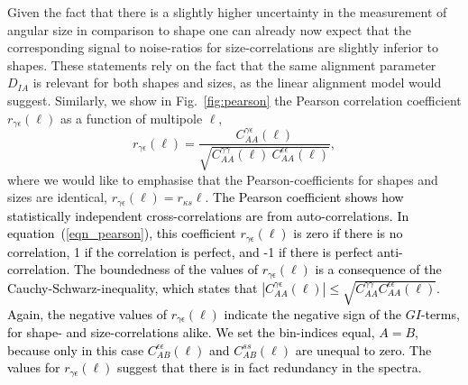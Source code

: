 \documentclass[a4paper,fleqn,usenatbib]{mnras}
\newcommand\spirou[1]{\textcolor{black}{#1}}
\begin{document}
Given the fact that there is a slightly higher uncertainty in the measurement of angular size in comparison to shape one can already now expect that the corresponding signal to noise-ratios for size-correlations are slightly inferior to shapes. These statements rely on the fact that the same alignment parameter $D_{IA}$ is relevant for both shapes and sizes, as the linear alignment model would suggest. Similarly, we show in Fig.~\ref{fig:pearson} the Pearson correlation coefficient $r_{\gamma\epsilon}(\ell)$ as a function of multipole $\ell$,
\begin{equation}
r_{\gamma\epsilon}(\ell) = 
\frac{C^{\gamma\epsilon}_{AA}(\ell)}{\sqrt{C^{\gamma\gamma}_{AA}(\ell)\: C^{\epsilon\epsilon}_{AA}(\ell)}},
\label{eqn_pearson}
\end{equation}
where we would like to emphasise that the Pearson-coefficients for shapes and sizes are identical, $r_{\gamma\epsilon}(\ell) = r_{\kappa s}{\ell}$. \spirou{The Pearson coefficient shows how statistically independent cross-correlations are from auto-correlations. In equation~(\ref{eqn_pearson}), this coefficient $r_{\gamma\epsilon}(\ell)$ is zero if there is no correlation, 1 if the correlation is perfect, and -1 if there is perfect anti-correlation. The boundedness of the values of $r_{\gamma\epsilon}(\ell)$ is a consequence of the Cauchy-Schwarz-inequality, which states that $\left|C^{\gamma\epsilon}_{AA}(\ell)\right|\leq\sqrt{C^{\gamma\gamma}_{AA}C^{\epsilon\epsilon}_{AA}(\ell)}$. Again, the negative values of $r_{\gamma\epsilon}(\ell)$ indicate the negative sign of the $GI$-terms, for shape- and size-correlations alike. We set the bin-indices equal, $A = B$, because only in this case $C^{\epsilon\epsilon}_{AB}(\ell)$ and $C^{ss}_{AB}(\ell)$ are unequal to zero. The values for $r_{\gamma\epsilon}(\ell)$ suggest that there is in fact redundancy in the spectra.} 
\end{document}
